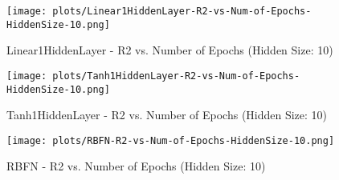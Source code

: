\begin{figure}[H]
    \centering
    \texttt{[image: plots/Linear1HiddenLayer-R2-vs-Num-of-Epochs-HiddenSize-10.png]}
    \caption{Linear1HiddenLayer - R2 vs. Number of Epochs (Hidden Size: 10)}
\end{figure}

\begin{figure}[H]
    \centering
    \texttt{[image: plots/Tanh1HiddenLayer-R2-vs-Num-of-Epochs-HiddenSize-10.png]}
    \caption{Tanh1HiddenLayer - R2 vs. Number of Epochs (Hidden Size: 10)}
\end{figure}

\begin{figure}[H]
    \centering
    \texttt{[image: plots/RBFN-R2-vs-Num-of-Epochs-HiddenSize-10.png]}
    \caption{RBFN - R2 vs. Number of Epochs (Hidden Size: 10)}
\end{figure}
